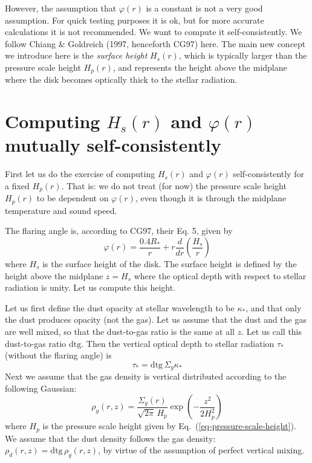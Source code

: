 \documentclass{book}
\begin{document}
However, the assumption that $\varphi(r)$ is a constant is not a very good
assumption. For quick testing purposes it is ok, but for more accurate
calculations it is not recommended. We want to compute it self-consistently.
We follow Chiang \& Goldreich (1997, henceforth CG97) here. The main new
concept we introduce here is the {\em surface height} $H_s(r)$, which is
typically larger than the pressure scale height $H_p(r)$, and represents
the height above the midplane where the disk becomes optically thick to
the stellar radiation.

\section{Computing $H_s(r)$ and $\varphi(r)$ mutually self-consistently}
\label{sec-disk-flaring}
First let us do the exercise of computing $H_s(r)$ and $\varphi(r)$
self-consistently for a fixed $H_p(r)$. That is: we do not treat (for now)
the pressure scale height $H_p(r)$ to be dependent on $\varphi(r)$,
even though it is through the midplane temperature and sound speed.

The flaring angle is, according to CG97, their Eq. 5, given by
\begin{equation}\label{eq-flang-cg}
\varphi(r) = \frac{0.4 R_{*}}{r} + r\frac{d}{dr}\left(\frac{H_s}{r}\right)
\end{equation}
where $H_s$ is the surface height of the disk. The surface height is defined
by the height above the midplane $z=H_s$ where the optical depth with respect
to stellar radiation is unity. Let us compute this height.

Let us first define the dust opacity at stellar wavelength to be $\kappa_{*}$,
and that only the dust produces opacity (not the gas). Let us assume that the
dust and the gas are well mixed, so that the dust-to-gas ratio is the same at
all $z$. Let us call this dust-to-gas ratio $\mathrm{dtg}$. Then the vertical
optical depth to stellar radiation $\tau_{*}$ (without the flaring angle) is
\begin{equation}
\tau_{*} = \mathrm{dtg}\,\Sigma_g\kappa_{*}
\end{equation}
Next we assume that the gas density is vertical distributed according to
the following Gaussian:
\begin{equation}\label{eq-vertstr-gauss}
\rho_g(r,z) = \frac{\Sigma_g(r)}{\sqrt{2\pi}\,H_p}\exp\left(-\frac{z^2}{2H_p^2}\right)
\end{equation}
where $H_p$ is the pressure scale height given by
Eq.~(\ref{eq-pressure-scale-height}). We assume that the dust density
follows the gas density: $\rho_d(r,z)=\mathrm{dtg}\,\rho_g(r,z)$, by virtue
of the assumption of perfect vertical mixing.
\end{document}
